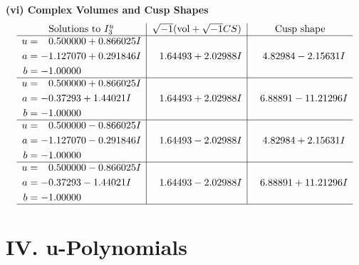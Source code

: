 \documentclass[1p]{elsarticle_modified}
\theoremstyle{definition}
\newcommand{\I}{\sqrt{-1}}
\begin{document}
\newpage\flushleft \textbf{(vi) Complex Volumes and Cusp Shapes}
$$\begin{array}{c|c|c}  
\text{Solutions to }I^u_{3}& \I (\text{vol} + \sqrt{-1}CS) & \text{Cusp shape}\\
 \hline 
\begin{aligned}
u &= \phantom{-}0.500000 + 0.866025 I \\
a &= -1.127070 + 0.291846 I \\
b &= -1.00000\phantom{ +0.000000I}\end{aligned}
 & \phantom{-}1.64493 + 2.02988 I & \phantom{-}4.82984 - 2.15631 I \\ \hline\begin{aligned}
u &= \phantom{-}0.500000 + 0.866025 I \\
a &= -0.37293 + 1.44021 I \\
b &= -1.00000\phantom{ +0.000000I}\end{aligned}
 & \phantom{-}1.64493 + 2.02988 I & \phantom{-}6.88891 - 11.21296 I \\ \hline\begin{aligned}
u &= \phantom{-}0.500000 - 0.866025 I \\
a &= -1.127070 - 0.291846 I \\
b &= -1.00000\phantom{ +0.000000I}\end{aligned}
 & \phantom{-}1.64493 - 2.02988 I & \phantom{-}4.82984 + 2.15631 I \\ \hline\begin{aligned}
u &= \phantom{-}0.500000 - 0.866025 I \\
a &= -0.37293 - 1.44021 I \\
b &= -1.00000\phantom{ +0.000000I}\end{aligned}
 & \phantom{-}1.64493 - 2.02988 I & \phantom{-}6.88891 + 11.21296 I\\
 \hline 
 \end{array}$$\newpage
\newpage\renewcommand{\arraystretch}{1}
\centering \section*{ IV. u-Polynomials}
\end{document}
